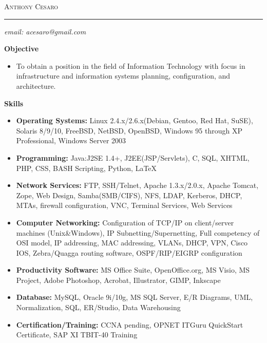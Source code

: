 \documentclass[10pt,oneside]{article}
\makeatletter
\newcommand{\name}{Anthony Cesaro}
\newcommand{\email}{acesaro@gmail.com}
\newcommand{\bigname}[1]{
	\begin{flushleft}\selectfont\Large\scshape#1\end{flushleft}
}
\newenvironment{ressection}[1]{
	\vspace{4pt}
	\textbf{\selectfont\normalsize#1}
	\begin{itemize}
	\vspace{3pt}
}{
	\end{itemize}
}
\newcommand{\resitem}[1]{
	\vspace{-4pt}
	\item \begin{flushleft} #1 \end{flushleft}
}
\makeatother
\begin{document}
 \selectfont

\bigname{\name}

\vspace{-8pt} \rule{\textwidth}{1pt}

\vspace{-1pt} {\small\itshape email: \email}
\vspace{8 pt}



\begin{ressection}{Objective}

	\resitem{To obtain a position in the field of Information Technology with focus in infrastructure and information systems planning, configuration, and architecture.}

\end{ressection}


\begin{ressection}{Skills}

	\resitem{\textbf{Operating Systems:} Linux 2.4.x/2.6.x(Debian, Gentoo, Red Hat, SuSE), Solaris 8/9/10, FreeBSD, NetBSD, OpenBSD, Windows 95 through XP Professional, Windows Server 2003}
	
	\resitem{\textbf{Programming:} Java:J2SE 1.4+, J2EE(JSP/Servlets), C, SQL, XHTML, PHP, CSS, BASH Scripting, Python, \LaTeX}

	\resitem{\textbf{Network Services:} FTP, SSH/Telnet, Apache 1.3.x/2.0.x, Apache Tomcat, Zope, Web Design, Samba(SMB/CIFS), NFS, LDAP, Kerberos, DHCP, MTAs, firewall configuration, VNC, Terminal Services, Web Services}

	\resitem{\textbf{Computer Networking:} Configuration of TCP/IP on client/server machines (Unix\&Windows), IP Subnetting/Supernetting, Full competency of OSI model, IP addressing, MAC addressing, VLANs, DHCP, VPN, Cisco IOS, Zebra/Quagga routing software, OSPF/RIP/EIGRP configuration}

	\resitem{\textbf{Productivity Software:} MS Office Suite, OpenOffice.org, MS Visio, MS Project, Adobe Photoshop, Acrobat, Illustrator, GIMP, Inkscape}

	\resitem{\textbf{Database:} MySQL, Oracle 9i/10g, MS SQL Server, E/R Diagrams, UML, Normalization, SQL, ER/Studio, Data Warehousing}

	\resitem{\textbf{Certification/Training:} CCNA pending, OPNET ITGuru QuickStart Certificate, SAP XI TBIT-40 Training}
	
\end{ressection}
\end{document}
